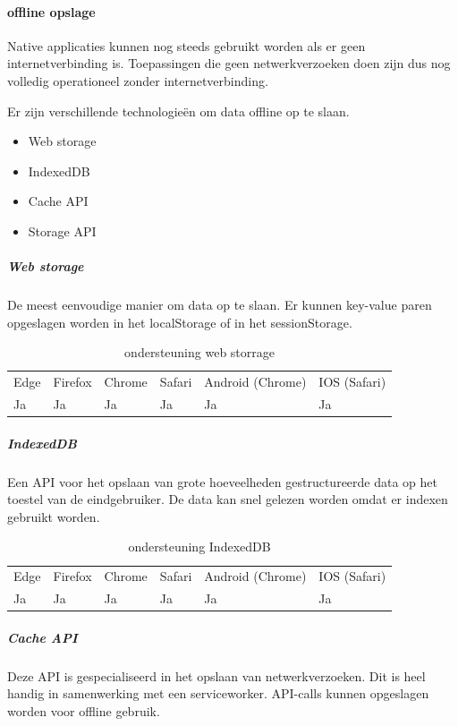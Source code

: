 \paragraph{offline opslage}
Native applicaties kunnen nog steeds gebruikt worden als er geen internetverbinding is. Toepassingen die geen netwerkverzoeken doen zijn dus nog volledig operationeel zonder internetverbinding. 

Er zijn verschillende technologieën om data offline op te slaan. 

 \begin{itemize}
	\item	Web storage
	\item	IndexedDB
	\item	Cache API
	\item	Storage API
\end{itemize}

	\subparagraph{Web storage}
	De meest eenvoudige manier om data op te slaan. Er kunnen key-value paren opgeslagen worden in het localStorage of in het sessionStorage. 
	\autocite{Hickson2020}
	
	\begin{table}[H]
		\centering
		\begin{tabular}{llllll}
			Edge & Firefox & Chrome & Safari & Android (Chrome) & IOS (Safari) \\
			Ja   & Ja      &  Ja     & Ja     & Ja               & Ja          
		\end{tabular}	
		\caption{ondersteuning web storrage }
	\end{table}
	
	
	
	\subparagraph{IndexedDB}
	Een API voor het opslaan van grote hoeveelheden gestructureerde data op het toestel van de eindgebruiker. De data kan snel gelezen worden omdat er indexen gebruikt worden. 
	\autocite{Alabbas2020}
	
	\begin{table}[H]
		\centering
			\begin{tabular}{llllll}
				Edge & Firefox & Chrome & Safari & Android (Chrome) & IOS (Safari) \\
				Ja   & Ja      &  Ja     & Ja     & Ja               & Ja          
			\end{tabular}	
			\caption{ondersteuning IndexedDB}
	\end{table}
	
	
	\subparagraph{Cache API}
	Deze API is gespecialiseerd in het opslaan van netwerkverzoeken. Dit is heel handig in samenwerking met een serviceworker. API-calls kunnen opgeslagen worden voor offline gebruik.
	\autocite{vanKesteren2020}
	
